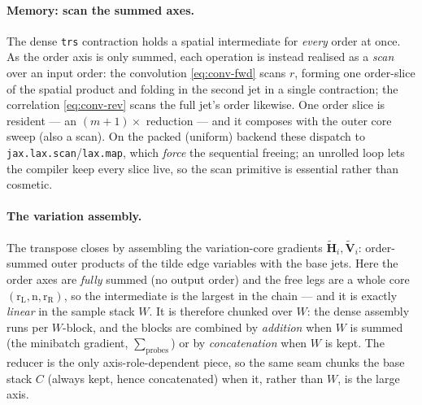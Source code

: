 \documentclass[11pt]{article}
\theoremstyle{definition}
\theoremstyle{plain}
\begin{document}
\paragraph{Memory: scan the summed axes.}
The dense \texttt{trs} contraction holds a spatial intermediate for \emph{every} order at once. As the
order axis is only summed, each operation is instead realised as a \emph{scan} over an input order: the
convolution \eqref{eq:conv-fwd} scans $r$, forming one order-slice of the spatial product and folding in
the second jet in a single contraction; the correlation \eqref{eq:conv-rev} scans the full jet's order
likewise. One order slice is resident --- an $(m{+}1)\times$ reduction --- and it composes with the
outer core sweep (also a scan). On the packed (uniform) backend these dispatch to
\texttt{jax.lax.scan}/\texttt{lax.map}, which \emph{force} the sequential freeing; an unrolled loop lets
the compiler keep every slice live, so the scan primitive is essential rather than cosmetic.

\paragraph{The variation assembly.}
The transpose closes by assembling the variation-core gradients $\widetilde{\mathbf H}_i,
\widetilde{\mathbf V}_i$: order-summed outer products of the tilde edge variables with the base
jets. Here the order axes are \emph{fully} summed (no output order) and the free legs are a whole core
$(\mathrm{r_L},\mathrm{n},\mathrm{r_R})$, so the intermediate is the largest in the chain --- and it is
exactly \emph{linear} in the sample stack $W$. It is therefore chunked over $W$: the dense assembly runs
per $W$-block, and the blocks are combined by \emph{addition} when $W$ is summed (the minibatch
gradient, $\sum_{\text{probes}}$) or by \emph{concatenation} when $W$ is kept. The reducer is the only
axis-role-dependent piece, so the same seam chunks the base stack $C$ (always kept, hence concatenated)
when it, rather than $W$, is the large axis.
\end{document}
